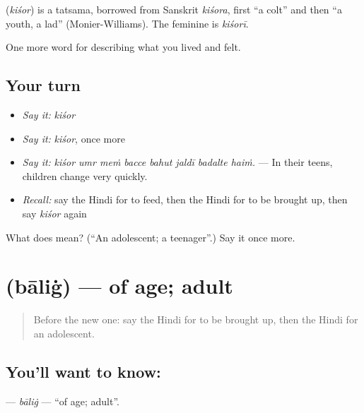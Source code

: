 \begin{cousinweb}
\textbf{} (\emph{kiśor}) is a tatsama, borrowed from Sanskrit \emph{kiśora}, first \textquotedblleft{}a colt\textquotedblright{} and then \textquotedblleft{}a youth, a lad\textquotedblright{} (Monier-Williams). The feminine is \emph{kiśorī}.
\end{cousinweb}

\begin{grammarlens}[title={What you've built}]
One more word for describing what you lived and felt.
\end{grammarlens}

\subsection*{Your turn}
\begin{itemize}
\raggedright
  \item \emph{Say it:} \emph{kiśor}
  \item \emph{Say it:} \emph{kiśor}, once more
  \item \emph{Say it:} \emph{kiśor umr meṁ bacce bahut jaldī badalte haiṁ.} — In their teens, children change very quickly.
  \item \emph{Recall:} say the Hindi for to feed, then the Hindi for to be brought up, then say \emph{kiśor} again
\end{itemize}

\begin{tcolorbox}[breakable,colback=teal!4,colframe=teal!35!black,title={Before you move on}]
What does  mean? (\textquotedblleft{}An adolescent; a teenager\textquotedblright{}.) Say it once more.
\end{tcolorbox}
\section[\texorpdfstring{\hi{बालिग़} (bāliġ)}{बालिग़ (bāliġ)}]{ (bāliġ) — of age; adult}

\label{lesson:HI-C499-balig}



\begin{quote}
Before the new one: say the Hindi for to be brought up, then the Hindi for an adolescent.
\end{quote}

\subsection*{You'll want to know: }
\textbf{} — \emph{bāliġ} — \textquotedblleft{}of age; adult\textquotedblright{}.

